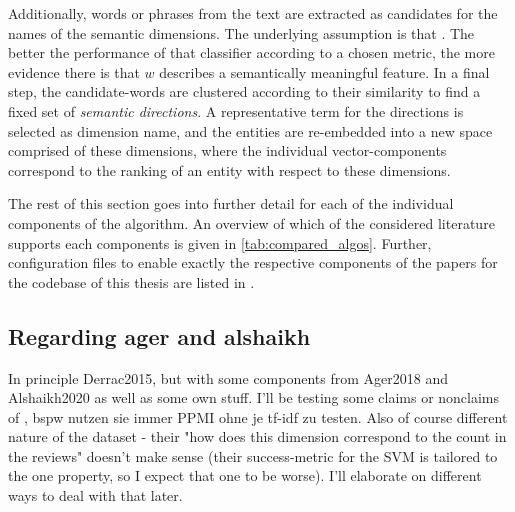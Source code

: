 Additionally, words or phrases from the text are extracted as candidates for the names of the semantic dimensions. The underlying assumption is that  \cite[3574]{Alshaikh2020}. The better the performance of that classifier according to a chosen metric, the more evidence there is that $w$ describes a semantically meaningful feature. 
In a final step, the candidate-words are clustered according to their similarity to find a fixed set of \emph{semantic directions}. A representative term for the directions is selected as dimension name, and the entities are re-embedded into a new space comprised of these dimensions, where the individual vector-components correspond to the ranking of an entity with respect to these dimensions.

The rest of this section goes into further detail for each of the individual components of the algorithm. An overview of which of the considered literature supports each components is given in \autoref{tab:compared_algos}. Further, configuration files to enable exactly the respective components of the papers \mainalgos for the codebase of this thesis are listed in .


\subsection{Regarding ager and alshaikh}



In principle Derrac2015, but with some components from Ager2018 and Alshaikh2020 as well as some own stuff. I'll be testing some claims or nonclaims of \mainalgos, bspw nutzen sie immer PPMI ohne je tf-idf zu testen. Also of course different nature of the dataset - their "how does this dimension correspond to the count in the reviews" doesn't make sense (their success-metric for the SVM is tailored to the one property, so I expect that one to be worse). I'll elaborate on different ways to deal with that later.


